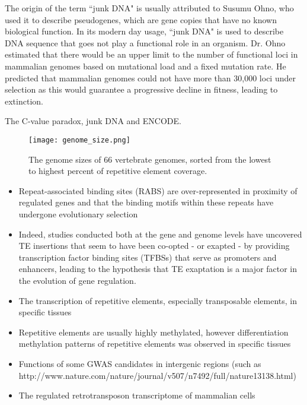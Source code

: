 The origin of the term ``junk DNA" is usually attributed to Susumu Ohno, who used it to describe pseudogenes, which are gene copies that have no known biological function. In its modern day usage, ``junk DNA" is used to describe DNA sequence that goes not play a functional role in an organism. Dr. Ohno estimated that there would be an upper limit to the number of functional loci in mammalian genomes based on mutational load and a fixed mutation rate. He predicted that mammalian genomes could not have more than 30,000 loci under selection as this would guarantee a progressive decline in fitness, leading to extinction.

The C-value paradox, junk DNA and ENCODE\cite{Eddy2012}.

\begin{figure}[!ht]
   \centering
   \texttt{[image: genome\_size.png]}
   \caption[Vertebrate genomes sizes]{The genome sizes of 66 vertebrate genomes, sorted from the lowest to highest percent of repetitive element coverage\cite{tang2014gensize}.}
   \label{fig:genome_size}
\end{figure}

\begin{itemize}
   \item Repeat-associated binding sites (RABS) are over-represented in proximity of regulated genes and that the binding motifs within these repeats have undergone evolutionary selection
   \item Indeed, studies conducted both at the gene and genome levels have uncovered TE insertions that seem to have been co-opted - or exapted - by providing transcription factor binding sites (TFBSs) that serve as promoters and enhancers, leading to the hypothesis that TE exaptation is a major factor in the evolution of gene regulation.
   \item The transcription of repetitive elements, especially transposable elements, in specific tissues
   \item Repetitive elements are usually highly methylated, however differentiation methylation patterns of repetitive elements was observed in specific tissues
   \item Functions of some GWAS candidates in intergenic regions (such as http://www.nature.com/nature/journal/v507/n7492/full/nature13138.html)
   \item The regulated retrotransposon transcriptome of mammalian cells\cite{pmid19377475}
\end{itemize}

